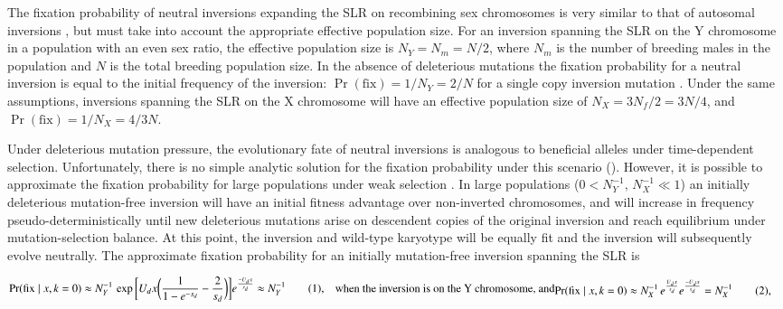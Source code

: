 \documentclass{article}[12pt]
\newcommand\numberthis{\addtocounter{equation}{1}\tag{\theequation}}
\begin{document}
The fixation probability of neutral inversions expanding the SLR on recombining sex chromosomes is very similar to that of autosomal inversions \citep{ConnallonOlito2020}, but must take into account the appropriate effective population size. For an inversion spanning the SLR on the Y chromosome in a population with an even sex ratio, the effective population size is $N_Y = N_m = N/2$, where $N_m$ is the number of breeding males in the population and $N$ is the total breeding population size. In the absence of deleterious mutations the fixation probability for a neutral inversion is equal to the initial frequency of the inversion: $\Pr(\text{fix}) = 1/N_Y = 2/N$ for a single copy inversion mutation \citep{Kimura1962, CrowKimura1970}. Under the same assumptions, inversions spanning the SLR on the X chromosome will have an effective population size of $N_X = 3 N_f/2 = 3 N/4 $, and $\Pr(\text{fix}) = 1/N_X = 4/3N$. 

Under deleterious mutation pressure, the evolutionary fate of neutral inversions is analogous to beneficial alleles under time-dependent selection. Unfortunately, there is no simple analytic solution for the fixation probability under this scenario (\citealt{OhtaKojima1968, KimuraOhta1970, UeckerHermisson2011, Waxman2011}). However, it is possible to approximate the fixation probability for large populations under weak selection \citep{ConnallonOlito2020}. In large populations ($0 < N_Y^{-1},\, N_X^{-1} \ll 1$) an initially deleterious mutation-free inversion will have an initial fitness advantage over non-inverted chromosomes, and will increase in frequency pseudo-deterministically until new deleterious mutations arise on descendent copies of the original inversion and reach equilibrium under mutation-selection balance. At this point, the inversion and wild-type karyotype will be equally fit and the inversion will subsequently evolve neutrally. The approximate fixation probability for an initially mutation-free inversion spanning the SLR is

\begin{subequations}\label{eq:NeutralPfix}
	\begin{align*}
		\Pr(\text{fix} \mid x, k = 0) &\approx N^{-1}_Y \, \exp \bigg[ U_d x \bigg( \frac{1}{1 - e^{-s_d} } - \frac{2}{s_d} \bigg) \bigg] e^{\frac{-U_d x}{s_d}} \approx N^{-1}_Y \numberthis,
	\end{align*}
	\text{when the inversion is on the Y chromosome, and}
	\begin{align*}
		\Pr(\text{fix} \mid x, k = 0)&\approx N^{-1}_X \, e^{\frac{U_d x}{s_d}} e^{\frac{-U_d x}{s_d}} = N^{-1}_X \numberthis, 
	\end{align*}
\end{subequations}
\end{document}
